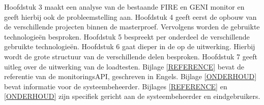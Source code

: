 \npar
Hoofdstuk 3 maakt een analyse van de bestaande FIRE en GENI monitor en geeft hierbij ook de probleemstelling aan.
\npar
Hoofdstuk 4 geeft eerst de opbouw van de verschillende projecten binnen de masterproef. Vervolgens worden de gebruikte technologie\"en besproken.
\npar
Hoofdstuk 5 bespreekt per onderdeel de verschillende gebruikte technologie\"en.
\npar
Hoofdstuk 6 gaat dieper in de op de uitwerking. Hierbij wordt de grote structuur van de verschillende delen besproken.
\npar
Hoofdstuk 7 geeft uitleg over de uitwerking van de loadtesten.
\npar
Bijlage \ref{REFERENCE} bevat de referentie van de monitoringsAPI, geschreven in Engels.
\npar
Bijlage \ref{ONDERHOUD}  bevat informatie voor de systeembeheerder.
\npar 
Bijlages \ref{REFERENCE} en \ref{ONDERHOUD} zijn specifiek gericht aan de systeembeheerder en eindgebruikers.